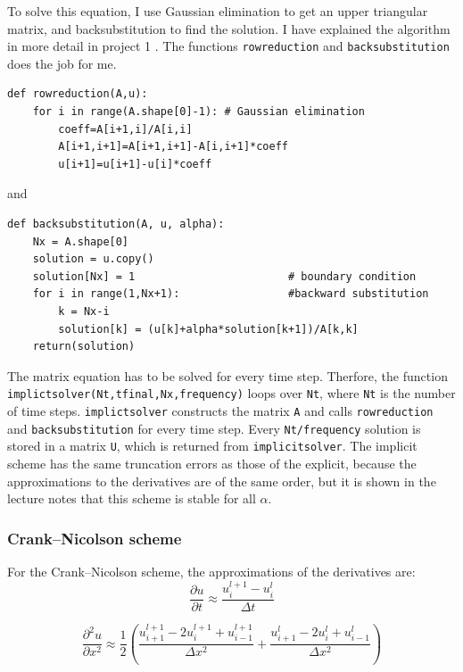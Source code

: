 \documentclass{article}
\begin{document}
To solve this equation, I use Gaussian elimination to get an upper triangular matrix, and backsubstitution to find the solution. I have explained the algorithm in more detail in project 1 \cite{Project1}. The functions \texttt{rowreduction} and \texttt{backsubstitution} does the job for me.

\begin{verbatim}
def rowreduction(A,u):
    for i in range(A.shape[0]-1): # Gaussian elimination
        coeff=A[i+1,i]/A[i,i]
        A[i+1,i+1]=A[i+1,i+1]-A[i,i+1]*coeff
        u[i+1]=u[i+1]-u[i]*coeff
\end{verbatim}

and 
\begin{verbatim}
def backsubstitution(A, u, alpha): 
    Nx = A.shape[0]
    solution = u.copy()
    solution[Nx] = 1                        # boundary condition
    for i in range(1,Nx+1):                 #backward substitution
        k = Nx-i
        solution[k] = (u[k]+alpha*solution[k+1])/A[k,k]
    return(solution)
\end{verbatim}
The matrix equation has to be solved for every time step. Therfore, the function  \texttt{implictsolver(Nt,tfinal,Nx,frequency)} loops over \texttt{Nt}, where \texttt{Nt} is the number of time steps. \texttt{implictsolver} constructs the matrix \texttt{A} and calls \texttt{rowreduction} and \texttt{backsubstitution} for every time step. Every \texttt{Nt/frequency} solution is stored in a matrix \texttt{U}, which is returned from  \texttt{implicitsolver}.
The implicit scheme has the same truncation errors as those of the explicit, because the approximations to the derivatives are of the same order, but it is shown in the lecture notes \cite{PDE} that this scheme is stable for all $\alpha$.

\subsubsection{Crank--Nicolson scheme}
For the Crank--Nicolson scheme, the approximations of the derivatives are:
\begin{equation*}
\frac{\partial u}{\partial t } \approx \frac{u_i^{l+1}-u_i^l}{\Delta t}
\end{equation*}

\begin{equation*}
\frac{\partial^2 u}{\partial x^2} \approx \frac{1}{2}(\frac{u_{i+1}^{l+1}-2u_i^{l+1}+u_{i-1}^{l+1}}{\Delta x^2}+ \frac{u_{i+1}^{l}-2u_i^{l}+u_{i-1}^{l}}{\Delta x^2})
\end{equation*}
\end{document}
